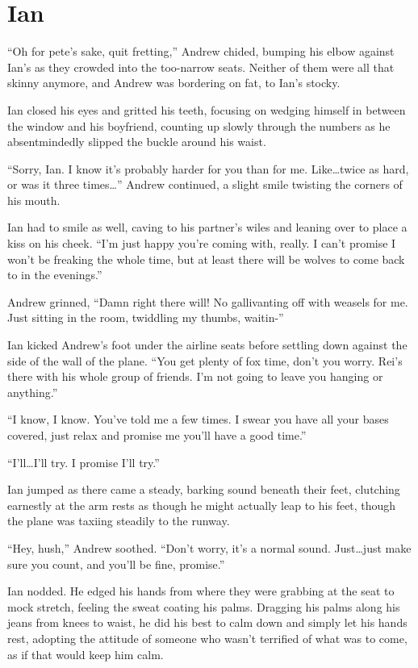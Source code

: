 \chapter{Ian}

``Oh for pete's sake, quit fretting,'' Andrew chided, bumping his elbow against Ian's as they crowded into the too-narrow seats. Neither of them were all that skinny anymore, and Andrew was bordering on fat, to Ian's stocky.

Ian closed his eyes and gritted his teeth, focusing on wedging himself in between the window and his boyfriend, counting up slowly through the numbers as he absentmindedly slipped the buckle around his waist.

``Sorry, Ian. I know it's probably harder for you than for me. Like\ldots{}twice as hard, or was it three times\ldots{}'' Andrew continued, a slight smile twisting the corners of his mouth.

Ian had to smile as well, caving to his partner's wiles and leaning over to place a kiss on his cheek. ``I'm just happy you're coming with, really. I can't promise I won't be freaking the whole time, but at least there will be wolves to come back to in the evenings.''

Andrew grinned, ``Damn right there will! No gallivanting off with weasels for me. Just sitting in the room, twiddling my thumbs, waitin-''

Ian kicked Andrew's foot under the airline seats before settling down against the side of the wall of the plane. ``You get plenty of fox time, don't you worry. Rei's there with his whole group of friends. I'm not going to leave you hanging or anything.''

``I know, I know. You've told me a few times. I swear you have all your bases covered, just relax and promise me you'll have a good time.''

``I'll\ldots{}I'll try. I promise I'll try.''

Ian jumped as there came a steady, barking sound beneath their feet, clutching earnestly at the arm rests as though he might actually leap to his feet, though the plane was taxiing steadily to the runway.

``Hey, hush,'' Andrew soothed. ``Don't worry, it's a normal sound. Just\ldots{}just make sure you count, and you'll be fine, promise.''

Ian nodded. He edged his hands from where they were grabbing at the seat to mock stretch, feeling the sweat coating his palms. Dragging his palms along his jeans from knees to waist, he did his best to calm down and simply let his hands rest, adopting the attitude of someone who wasn't terrified of what was to come, as if that would keep him calm.

